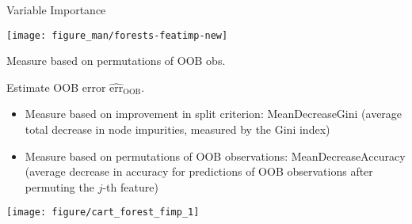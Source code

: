 \documentclass[11pt,compress,t,notes=noshow, xcolor=table]{beamer}
\begin{document}
\begin{vbframe}{Variable Importance}
\begin{figure}
\begin{knitrout}
\end{knitrout}
\end{figure}

\framebreak

\begin{minipage}[b]{0.35\textwidth}
  \texttt{[image: figure\_man/forests-featimp-new]}
\end{minipage}%
\begin{minipage}[b]{0.65\textwidth}
  \begin{algorithm}[H]
  \scriptsize
  \caption*{\small{Measure based on permutations of OOB obs.}}
  \begin{algorithmic}[0]
    \State Estimate OOB error $\widehat{\text{err}}_{\text{OOB}}$.
    \EndFor
    \EndFor
  \end{algorithmic}
\end{algorithm}
\end{minipage}


\framebreak

\begin{itemize}
  \item Measure based on improvement in split criterion: MeanDecreaseGini (average total decrease in node impurities, measured by the Gini index)
  \item Measure based on permutations of OOB observations: MeanDecreaseAccuracy (average decrease in accuracy for predictions of OOB observations after permuting the $j$-th feature)
\end{itemize}
{\texttt{[image: figure/cart\_forest\_fimp\_1]}} 


\end{vbframe}
\end{document}
